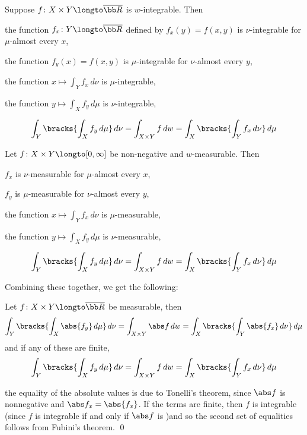     Suppose $f\colon X\times Y\longto\overline{\bb R}$ is $w$-integrable.
    Then
    \benum
        \item the function $f_x\colon Y\longto\overline{\bb R}$ defined by $f_x(y)=f(x,y)$ is $\nu$-integrable for $\mu$-almost every $x$,
        \item the function $f_y(x)=f(x,y)$ is $\mu$-integrable for $\nu$-almost every $y$,
        \item the function $x\mapsto\int_Yf_x\,d\nu$ is $\mu$-integrable,
        \item the function $y\mapsto\int_Xf_y\,d\mu$ is $\nu$-integrable,
        \item
            $$ \int_Y\bracks{\int_Xf_y\,d\mu}\,d\nu = \int_{X\times Y}f\,dw = \int_X\bracks{\int_Yf_x\,d\nu}\,d\mu $$
    \eenum

\ethrm

\bthrm[title=Tonelli's Theorem, name=tonelli]

    Let $f\colon X\times Y\longto[0,\infty]$ be non-negative and $w$-measurable.
    Then
    \benum
        \item $f_x$ is $\nu$-measurable for $\mu$-almost every $x$,
        \item $f_y$ is $\mu$-measurable for $\nu$-almost every $y$,
        \item the function $x\mapsto\int_Yf_x\,d\nu$ is $\mu$-measurable,
        \item the function $y\mapsto\int_Xf_y\,d\mu$ is $\nu$-measurable,
        \item
            $$ \int_Y\bracks{\int_Xf_y\,d\mu}\,d\nu = \int_{X\times Y}f\,dw = \int_X\bracks{\int_Yf_x\,d\nu}\,d\mu $$
    \eenum

\ethrm

Combining these together, we get the following:

\bthrm[title=Fubini-Tonelli, name=fubinitonelli]

    Let $f\colon X\times Y\longto\overline{\bb R}$ be measurable, then
    $$ \int_Y\bracks{\int_X\abs{f_y}\,d\mu}\,d\nu = \int_{X\times Y}\abs f\,dw = \int_X\bracks{\int_Y\abs{f_x}\,d\nu}\,d\mu $$
    and if any of these are finite,
    $$ \int_Y\bracks{\int_Xf_y\,d\mu}\,d\nu = \int_{X\times Y}f\,dw = \int_X\bracks{\int_Yf_x\,d\nu}\,d\mu $$

\ethrm

\Proof the equality of the absolute values is due to Tonelli's theorem, since $\abs f$ is nonnegative and $\abs f_x=\abs{f_x}$.
If the terms are finite, then $f$ is integrable (since $f$ is integrable if and only if $\abs f$ is )and so the second set of equalities follows from Fubini's theorem.
\qed


